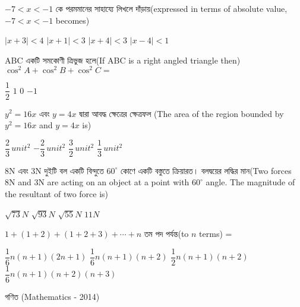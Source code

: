 \documentclass[addpoints]{exam}
\begin{document}
\begin{questions}
\question  $ -7<x<-1 $ কে পরমমানের সাহায্যে লিখলে দাঁড়ায়(expressed in terms of absolute value, $ -7<x<-1 $ becomes)
  
\begin{oneparchoices}
\choice $ |x+3|<4 $
\choice $ |x+1|<3 $
\choice $ |x+4|<3 $
\choice  $ |x-4|<1 $

\end{oneparchoices}

\question  ABC একটি সমকোণী ত্রিভুজ হলে(If ABC is a right angled triangle then) $ \cos^{2}A +\cos^{2}B + \cos^{2}C = $
\begin{oneparchoices}
\choice $ \dfrac{1}{2} $
\choice $ 1 $
\choice $ 0 $
\choice  $ -1 $

\end{oneparchoices}

\question $ y^{2} = 16x $ এবং $ y=4x $ দ্বারা আবদ্ধ ক্ষেত্রের ক্ষেত্রফল (The area of the region bounded by $ y^{2} = 16x $ and $ y=4x $ is)

\begin{oneparchoices}
\choice $ \dfrac{2}{3}\, unit^{2}$
\choice $  -\dfrac{2}{3}\, unit^{2} $
\choice $  \dfrac{3}{2}\, unit^{2} $
\choice  $  \dfrac{1}{3}\, unit^{2}$

\end{oneparchoices}

\question   8N এবং 3N দুইটি বল একটি বিন্দুতে $ 60^{\circ} $ কোণে একটি বস্তুতে ক্রিয়ারত। বলদ্বয়ের লদ্ধির মান(Two forces 8N and 3N are acting on an object at a point with $ 60^{\circ} $ angle. The magnitude of the resultant of two force is) 


\begin{oneparchoices}
\choice $ \sqrt{73}N $
\choice $ \sqrt{93}N $
\choice $ \sqrt{55}N $
\choice  $ 11N $

\end{oneparchoices}

\question  $ 1+(1+2)+(1+2+3)+\cdots +n $ তম পদ পর্যন্ত(to $ n $ terms) =

\begin{oneparchoices}
\choice $ \dfrac{1}{6}n(n+1)(2n+1) $
\choice $ \dfrac{1}{6}n(n+1)(n+2) $
\choice $ \dfrac{1}{2}n(n+1)(n+2) $
\choice $ \dfrac{1}{6}n(n+1)(n+2)(n+3) $

\end{oneparchoices}

\end{questions}
\begin{LARGE}
\begin{center}
গণিত (Mathematics - 2014)
\end{center}
\end{LARGE}
\end{document}
